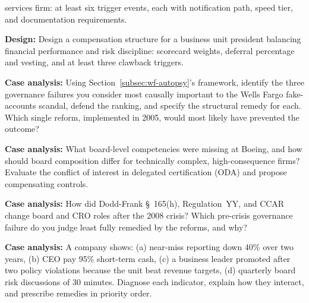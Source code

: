 \documentclass[11pt,openany]{book}
\begin{document}
\begin{discussionquestions}
  services firm: at least six trigger events, each with notification path,
  speed tier, and documentation requirements.
\item \textbf{Design:} Design a compensation structure for a business unit
  president balancing financial performance and risk discipline: scorecard
  weights, deferral percentage and vesting, and at least three clawback
  triggers.
\item \textbf{Case analysis:} Using Section~\ref{subsec:wf-autopsy}'s
  framework, identify the three governance failures you consider most
  causally important to the Wells Fargo fake-accounts scandal, defend the
  ranking, and specify the structural remedy for each. Which single reform,
  implemented in 2005, would most likely have prevented the outcome?
\item \textbf{Case analysis:} What board-level competencies were missing at
  Boeing, and how should board composition differ for technically complex,
  high-consequence firms? Evaluate the conflict of interest in delegated
  certification (ODA) and propose compensating controls.
\item \textbf{Case analysis:} How did Dodd-Frank \S~165(h), Regulation~YY,
  and CCAR change board and CRO roles after the 2008 crisis? Which
  pre-crisis governance failure do you judge least fully remedied by the
  reforms, and why?
\item \textbf{Case analysis:} A company shows: (a) near-miss reporting down
  40\% over two years, (b) CEO pay 95\% short-term cash, (c) a business
  leader promoted after two policy violations because the unit beat revenue
  targets, (d) quarterly board risk discussions of 30 minutes. Diagnose each
  indicator, explain how they interact, and prescribe remedies in priority
  order.
\end{discussionquestions}
\end{document}
